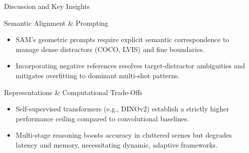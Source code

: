 \documentclass[aspectratio=169, 10pt]{beamer}
\begin{document}
\begin{frame}{Discussion and Key Insights}
    \begin{block}{Semantic Alignment \& Prompting}
        \footnotesize
        \begin{itemize}
            \item SAM's geometric prompts require explicit semantic correspondence to manage dense distractors (COCO, LVIS) and fine boundaries.
            \item Incorporating negative references resolves target-distractor ambiguities and mitigates overfitting to dominant multi-shot patterns.
        \end{itemize}
    \end{block}

    \begin{block}{Representations \& Computational Trade-Offs}
        \footnotesize
        \begin{itemize}
            \item Self-supervised transformers (e.g., DINOv2) establish a strictly higher performance ceiling compared to convolutional baselines.
            \item Multi-stage reasoning boosts accuracy in cluttered scenes but degrades latency and memory, necessitating dynamic, adaptive frameworks.
        \end{itemize}
    \end{block}
\end{frame}
\end{document}
